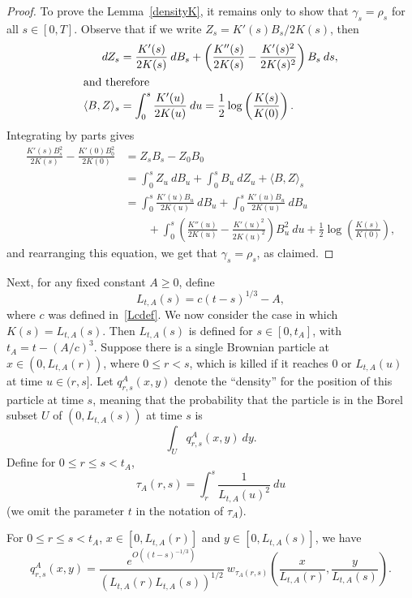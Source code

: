 \documentclass[AHL,Unicode,longabstracts,published]{cedram}
\newcommand{\1} {\mathds{1}}
\begin{document}
\begin{proof}
To prove the Lemma~\ref{densityK}, it remains only to show that $\gamma_s = \rho_s$ for all $s \in [0, T]$. Observe that if we write $Z_s = K'(s)B_s/2K(s)$, then
\begin{align*}
dZ_s &= \frac{K'(s)}{2K(s)} \: dB_s + \left(\frac{K''(s)}{2K(s)} - \frac{K'(s)^2}{2K(s)^2} \right) B_s \: ds,
\\
\intertext{and therefore}
\langle B, Z \rangle_s &= \int_0^s \frac{K'(u)}{2K(u)} \: du = \frac{1}{2} \log \left(\frac{K(s)}{K(0)} \right).
\end{align*}
Integrating by parts gives
\begin{align*}
\frac{K'(s) B_s^2}{2K(s)} - \frac{K'(0)B_0^2}{2K(0)} &= Z_sB_s-Z_0B_0 \\
&= \int_0^sZ_u \: dB_u + \int_0^s B_u \: dZ_u + \langle B, Z \rangle_s\\
&= \int_0^s \frac{K'(u) B_u}{2K(u)} \: dB_u + \int_0^s \frac{K'(u)B_u}{2K(u)} \: dB_u \\
&\qquad+ \int_0^s \left(\frac{K''(u)}{2K(u)} - \frac{K'(u)^2}{2K(u)^2} \right) B_u^2 \: du + \frac{1}{2} \log \left(\frac{K(s)}{K(0)} \right),
\end{align*}
and rearranging this equation, we get that $\gamma_s = \rho_s$, as claimed.
\end{proof}

Next, for any fixed constant $A \geq 0$, define
\begin{equation}\label{LAdef}
L_{t,A}(s) = c(t - s)^{1/3} - A,
\end{equation}
where $c$ was defined in~\eqref{Lcdef}.
We now consider the case in which $K(s) = L_{t,A}(s)$. Then $L_{t,A}(s)$ is defined for $s \in [0,t_A]$, with $t_A = t - (A/c)^3$. Suppose there is a single Brownian particle at $x \in (0, L_{t,A}(r))$, where $0 \leq r < s$, which is killed if it reaches $0$ or $L_{t,A}(u)$ at time $u \in (r, s]$. Let $q_{r,s}^A(x,y)$ denote the ``density'' for the position of this particle at time $s$, meaning that the probability that the particle is in the Borel subset $U$ of $(0, L_{t,A}(s))$ at time $s$ is
\[
\int_U q_{r,s}^A(x,y) \: dy.
\]
Define for $0\le r\le s < t_A$,
\begin{equation}\label{taursdef}
\tau_A(r,s) = \int_r^s \frac{1}{L_{t,A}(u)^2} \: du
\end{equation}
(we omit the parameter $t$ in the notation of $\tau_A$).

\begin{prop}\label{prop:qrs}
For $0\le r\le s< t_A$, $x\in[0,L_{t,A}(r)]$ and $y\in[0,L_{t,A}(s)]$, we have
\[
q_{r,s}^A(x,y) = \frac{e^{O\left((t-s)^{-1/3}\right)}}{\left(L_{t,A}(r) L_{t,A}(s)\right)^{1/2}} \: w_{\tau_A(r,s)} \left(\frac{x}{L_{t,A}(r)}, \frac{y}{L_{t,A}(s)} \right).
\]
\end{prop}
\end{document}
